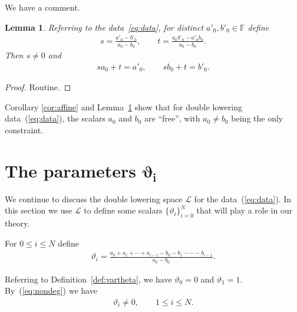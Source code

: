 \documentclass[pdftex]{sigma}
\numberwithin{equation}{section}
\newtheorem{Lemma}[Theorem]{Lemma}
\begin{document}
We have a comment.

\begin{Lemma}\label{lem:a0b0free}
Referring to the data~\eqref{eq:data},
for distinct $a'_0, b'_0 \in \mathbb F$ define
\begin{gather*}
s = \frac{a'_0 - b'_0}{ a_0-b_0}, \qquad
t= \frac{a_0 b'_0 - a'_0 b_0}{ a_0-b_0}.
\end{gather*}
Then $s\not=0$ and
\begin{gather*}
 s a_0 + t = a'_0, \qquad
 s b_0 + t = b'_0.
\end{gather*}
\end{Lemma}
\begin{proof} Routine.
\end{proof}

Corollary \ref{cor:affine} and Lemma~\ref{lem:a0b0free} show that for double lowering data~(\ref{eq:data}),
the scalars $a_0$ and $b_0$ are ``free'', with $a_0\not=b_0$ being
the only constraint.

\section[The parameters vartheta i]{The parameters $\boldsymbol{\vartheta_i}$}\label{section4}

We continue to discuss the double lowering space $\mathcal L$ for the data~(\ref{eq:data}). In this section we use $\mathcal L$
 to define some scalars $\lbrace \vartheta_i \rbrace_{i=0}^N$ that will play a role in our theory.

\begin{Definition}\label{def:vartheta}
For $0 \leq i \leq N$ define
\begin{gather*}
\vartheta_i = \frac{a_0 + a_1 + \cdots + a_{i-1}-b_0 - b_1 - \cdots - b_{i-1}}
{a_0 -b_0}.
\end{gather*}
\end{Definition}
Referring to Definition~\ref{def:vartheta}, we have $\vartheta_0 = 0$ and $\vartheta_1 = 1$.
By~(\ref{eq:nondeg}) we have
\begin{gather*}
\vartheta_i \not=0, \qquad 1 \leq i \leq N.
\end{gather*}
\end{document}

